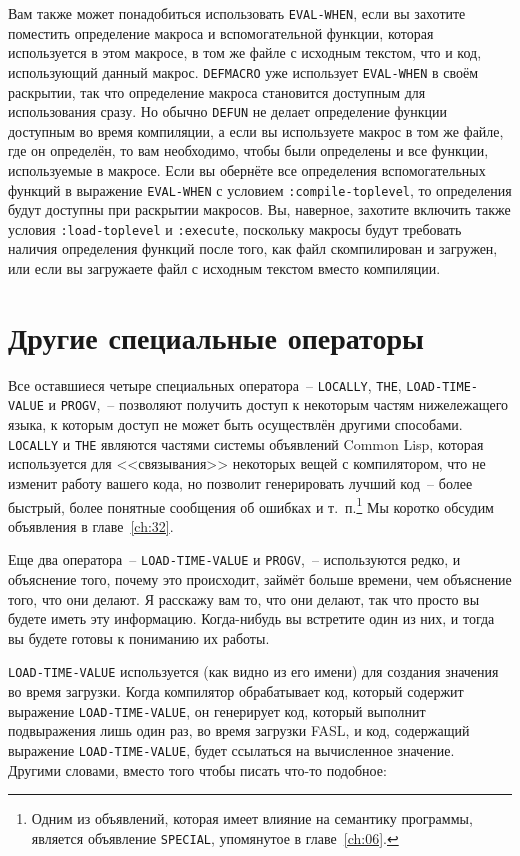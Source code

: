 Вам также может понадобиться использовать \lstinline{EVAL-WHEN}, если вы захотите поместить
определение макроса и вспомогательной функции, которая используется в этом макросе, в том
же файле с исходным текстом, что и код, использующий данный макрос. \lstinline{DEFMACRO} уже
использует \lstinline{EVAL-WHEN} в своём раскрытии, так что определение макроса становится
доступным для использования сразу.  Но обычно \lstinline{DEFUN} не делает определение функции
доступным во время компиляции, а если вы используете макрос в том же файле, где он
определён, то вам необходимо, чтобы были определены и все функции, используемые в
макросе. Если вы обернёте все определения вспомогательных функций в выражение
\lstinline{EVAL-WHEN} с условием \lstinline{:compile-toplevel}, то определения будут доступны при
раскрытии макросов. Вы, наверное, захотите включить также условия \lstinline{:load-toplevel} и
\lstinline{:execute}, поскольку макросы будут требовать наличия определения функций после того,
как файл скомпилирован и загружен, или если вы загружаете файл с исходным текстом вместо
компиляции.

\section{Другие специальные операторы}

Все оставшиеся четыре специальных оператора~-- \lstinline{LOCALLY}, \lstinline{THE},
\lstinline{LOAD-TIME-VALUE} и \lstinline{PROGV},~-- позволяют получить доступ к некоторым частям
нижележащего языка, к которым доступ не может быть осуществлён другими способами.
\lstinline{LOCALLY} и \lstinline{THE} являются частями системы объявлений Common Lisp, которая
используется для <<связывания>> некоторых вещей с компилятором, что не изменит работу
вашего кода, но позволит генерировать лучший код~-- более быстрый, более понятные
сообщения об ошибках и т.~п.\footnote{Одним из объявлений, которая имеет влияние на
  семантику программы, является объявление \lstinline{SPECIAL}, упомянутое в главе~\ref{ch:06}.}
  Мы коротко обсудим объявления в главе~\ref{ch:32}.

Еще два оператора~-- \lstinline{LOAD-TIME-VALUE} и \lstinline{PROGV},~-- используются редко, и
объяснение того, почему это происходит, займёт больше времени, чем объяснение того, что
они делают. Я расскажу вам то, что они делают, так что просто вы будете иметь эту
информацию. Когда-нибудь вы встретите один из них, и тогда вы будете готовы к пониманию их
работы.

\lstinline{LOAD-TIME-VALUE} используется (как видно из его имени) для создания значения во
время загрузки.  Когда компилятор обрабатывает код, который содержит выражение
\lstinline{LOAD-TIME-VALUE}, он генерирует код, который выполнит подвыражения лишь один раз, во
время загрузки FASL, и код, содержащий выражение \lstinline{LOAD-TIME-VALUE}, будет ссылаться на
вычисленное значение.  Другими словами, вместо того чтобы писать что-то подобное:

